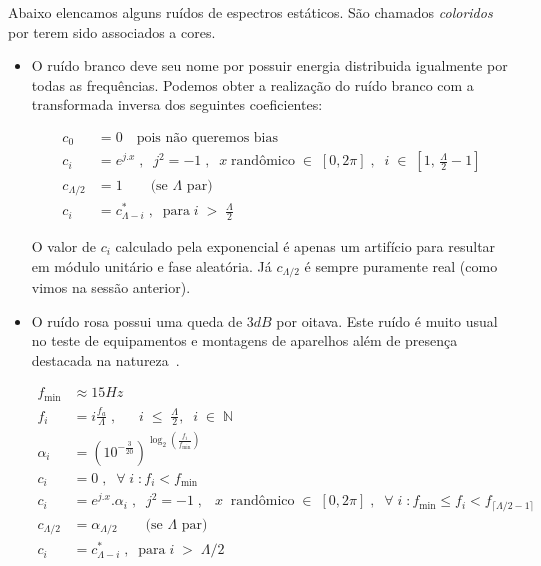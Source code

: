 Abaixo elencamos alguns ruídos de espectros estáticos. São chamados \emph{coloridos} por terem sido associados a cores. 

\begin{itemize}

\item O ruído branco deve seu nome por possuir energia distribuida
igualmente por todas as frequências. Podemos obter a realização
do ruído branco com a transformada inversa dos seguintes coeficientes:


\begin{equation}\label{eq:branco}
\begin{split}
c_0 & =0 \quad \text{pois não queremos bias} \\
c_i & =e^{j.x}\;,\;\; j^2=-1 \;, \;\; x \; \text{randômico} \; \in \; [0,2\pi]\;,\;\; i \; \in \; \left[1, \, \frac{\Lambda}{2}-1\right] \\
c_{\Lambda/2} & = 1 \quad\quad \text{(se $\Lambda$ par)}\\ 
c_i & = c_{\Lambda - i}^*\;,\;\; \text{para}\;  i \; > \;  \frac{\Lambda}{2}
\end{split}
\end{equation}

O valor de $c_i$ calculado pela exponencial é apenas um artifício para resultar em módulo unitário e fase aleatória.
Já $c_{\Lambda/2}$ é sempre puramente real (como vimos na sessão anterior).

\item O ruído rosa possui uma queda de $3dB$ por oitava. Este ruído é muito usual no teste de equipamentos e montagens de aparelhos além de presença destacada na natureza~\cite{Roederer}. 

\begin{equation}\label{eq:rosa}
\begin{split}
f_{\text{min}} & \approx 15 Hz \\
f_i & = i \frac{f_a}{\Lambda} \;, \;\; \quad i \;\leq\; \frac{\Lambda}{2},\;\; i\;\in\;\mathbb{N}  \\
\alpha_i & = (10^{-\frac{3}{20}})^{\log _2 \left ( \frac{f_i}{f_{\text{min}}} \right )}  \\
c_i & =0\;,\;\; \forall \; i \; : f_i<f_{\text{min}} \\
c_i & =e^{j.x} . \alpha_i\;,\;\; j^2=-1 \;, \;\;\  x \;\; \text{randômico} \; \in \; [0,2\pi]\;,\;\; \forall \; i \; : f_{\text{min}} \le f_i < f_{\lceil \Lambda/2-1 \rceil}  \\
c_{\Lambda/2} & = \alpha_{\Lambda/2} \quad\quad \text{(se $\Lambda$ par)}\\ 
c_i & = c_{\Lambda - i}^*\;,\;\; \text{para}\;  i \; > \;  \Lambda/2
\end{split}
\end{equation}


\end{itemize}
